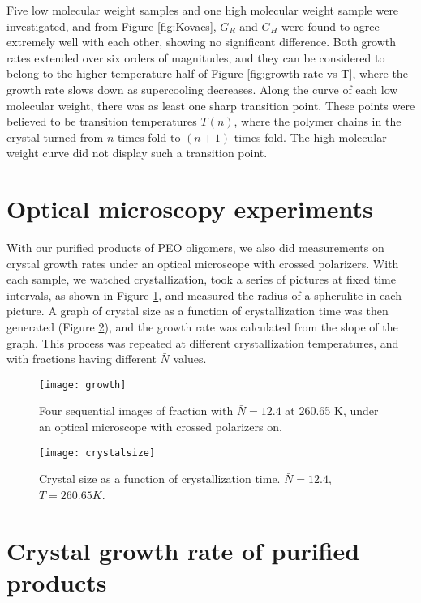 Five low molecular weight samples and one high molecular weight sample were investigated, and from Figure \ref{fig:Kovacs}, $G_{R}$ and $G_{H}$ were found to agree extremely well with each other, showing no significant difference. Both growth rates extended over six orders of magnitudes, and they can be considered to belong to the higher temperature half of Figure \ref{fig:growth rate vs T}, where the growth rate slows down as supercooling decreases. Along the curve of each low molecular weight, there was as least one sharp transition point. These points were believed to be transition temperatures $T(n)$, where the polymer chains in the crystal turned from $n$-times fold to $(n+1)$-times fold. The high molecular weight curve did not display such a transition point.

\section{Optical microscopy experiments}

With our purified products of PEO oligomers, we also did measurements on crystal growth rates under an optical microscope with crossed polarizers. With each sample, we watched crystallization, took a series of pictures at fixed time intervals, as shown in Figure \ref{fig:growth}, and measured the radius of a spherulite in each picture. A graph of crystal size as a function of crystallization time was then generated (Figure \ref{fig:crystal size}), and the growth rate was calculated from the slope of the graph. This process was repeated at different crystallization temperatures, and with fractions having different $\bar{N}$ values.

\begin{figure}[H]
\center
\texttt{[image: growth]}
\caption{Four sequential images of fraction with $\bar{N} = 12.4$ at 260.65 K, under an optical microscope with crossed polarizers on.}
\label{fig:growth}
\end{figure}

\begin{figure}[H]
	\center
	\texttt{[image: crystalsize]}
	\caption{Crystal size as a function of crystallization time. $\bar{N} = 12.4$, $T = 260.65 K$.}
	\label{fig:crystal size}
\end{figure}

\section{Crystal growth rate of purified products}

